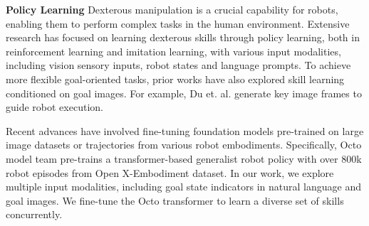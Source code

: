 {\bf Policy Learning} 
Dexterous manipulation is a crucial capability for robots, enabling them to perform complex tasks in the human environment\cite{shah2021rrl,padalkar2023open, ahn2024autort,yang2023moma,zhao2023learning}.
Extensive research has focused on learning dexterous skills through policy learning, both in reinforcement learning and imitation learning, with various input modalities, including vision sensory inputs\cite{andrychowicz2020learning,yang2023moma}, robot states\cite{shah2021rrl,chi2023diffusion,zhao2023learning,team2024octo,mandlekar2021matters,liu2024moka} and language prompts\cite{team2024octo,jiang2022vima}. 
To achieve more flexible goal-oriented tasks, prior works have also explored skill learning conditioned on goal images\cite{team2024octo,jiang2022vima,du2024learning}. 
For example, Du et. al.\cite{du2024learning} generate key image frames to guide robot execution.

Recent advances have involved fine-tuning foundation models pre-trained on large image datasets\cite{shah2021rrl,yang2023moma,chi2023diffusion,xu2023joint} or trajectories from various robot embodiments\cite{padalkar2023open,ahn2024autort,team2024octo}. 
Specifically, Octo model team\cite{team2024octo} pre-trains a transformer-based generalist robot policy with over 800k robot episodes from Open X-Embodiment dataset\cite{open_x_embodiment_rt_x_2023}.
In our work, we explore multiple input modalities, including goal state indicators in natural language and goal images. We fine-tune the Octo transformer to learn a diverse set of skills concurrently.


